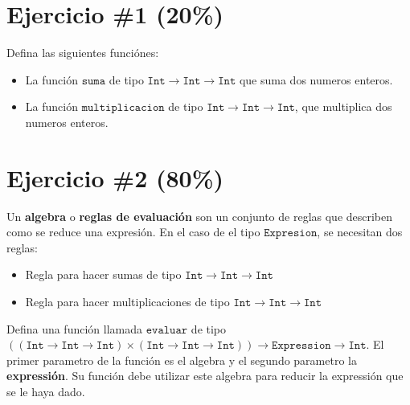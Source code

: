 \documentclass{article}
\begin{document}
\section*{Ejercicio \#1 (20\%)}
Defina las siguientes funci\'ones:
\begin{itemize}
        \item{La funci\'on $\mathtt{suma}$ de tipo $\mathtt{Int}\rightarrow\mathtt{Int}
        \rightarrow\mathtt{Int}$ que suma dos numeros enteros.}
        \item{La funci\'on $\mathtt{multiplicacion}$ de tipo $\mathtt{Int}\rightarrow\mathtt{Int}
        \rightarrow\mathtt{Int}$, que multiplica dos numeros enteros.}
\end{itemize}


\section*{Ejercicio \#2 (80\%)}

Un {\bf algebra} o {\bf reglas de evaluaci\'on} son un conjunto de reglas que describen como
se reduce una expresi\'on. En el caso de el tipo $\mathtt{Expresion}$, se necesitan dos reglas:
\begin{itemize}
        \item{Regla para hacer sumas de tipo $\mathtt{Int}\rightarrow\mathtt{Int}
        \rightarrow\mathtt{Int}$}
        \item{Regla para hacer multiplicaciones de tipo $\mathtt{Int}\rightarrow\mathtt{Int}
        \rightarrow\mathtt{Int}$}
\end{itemize}

Defina una funci\'on llamada $\mathtt{evaluar}$ de tipo $\mathtt{((Int\rightarrow Int\rightarrow Int)\times
(\mathtt{Int}\rightarrow\mathtt{Int}\rightarrow\mathtt{Int}))}\rightarrow \mathtt{Expression}\rightarrow \mathtt{Int}$.
El primer parametro de la funci\'on es el algebra y el segundo parametro la {\bf expressi\'on}. Su
funci\'on debe utilizar este algebra para reducir la expressi\'on que se le haya dado.
\end{document}
